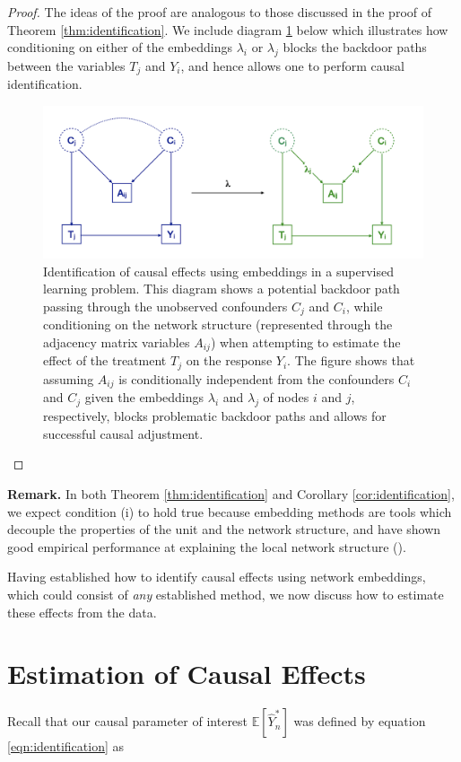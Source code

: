 \documentclass{article}
\begin{document}
\begin{proof}
The ideas of the proof are analogous to those discussed in the proof of Theorem \ref{thm:identification}. We include diagram \ref{fig:case2} below which illustrates how conditioning on either of the embeddings $\lambda_i$ or $
\lambda_j$ blocks the backdoor paths between the variables $T_j$ and $Y_i$, and hence allows one to perform causal identification. 

\begin{figure}
  \includegraphics[width=\linewidth]{case2.png}
  \caption{Identification of causal effects using embeddings in a supervised learning problem. This diagram shows a potential backdoor path passing through the unobserved confounders $C_j$ and $C_i$, while conditioning on the network structure (represented through the adjacency matrix variables $A_{ij}$) when attempting to estimate the effect of the treatment $T_j$ on the response $Y_i$. The figure shows that assuming $A_{ij}$ is conditionally independent from the confounders $C_i$ and $C_j$ given the embeddings $\lambda_i$ and $\lambda_j$ of nodes $i$ and $j$, respectively, blocks problematic backdoor paths and allows for successful causal adjustment.}
  \label{fig:case2}
\end{figure}
\end{proof}

\textbf{Remark.} In both Theorem \ref{thm:identification} and Corollary \ref{cor:identification}, we expect condition (i) to hold true because embedding methods are tools which decouple the properties of the unit and the network structure, and have shown good empirical performance at explaining the local network structure (\cite{Hamilton:Ying:Leskovec:2018}). 

Having established how to identify causal effects using network embeddings, which could consist of \textit{any} established method, we now discuss how to estimate these effects from the data. 


\section{Estimation of Causal Effects}
\label{sec:estimation}
Recall that our causal parameter of interest $\mathbb{E}[\hat{Y}_n^*]$ was defined by equation \ref{eqn:identification} as
\end{document}

